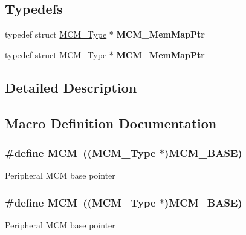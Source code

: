 \subsection*{Typedefs}
\begin{DoxyCompactItemize}
\item 
typedef struct \hyperlink{structMCM__Type}{M\+C\+M\+\_\+\+Type} $\ast$ {\bfseries M\+C\+M\+\_\+\+Mem\+Map\+Ptr}\hypertarget{group__MCM__Peripheral__Access__Layer_gad6061cc2e68f7c03970d2f22222ce817}{}\label{group__MCM__Peripheral__Access__Layer_gad6061cc2e68f7c03970d2f22222ce817}

\item 
typedef struct \hyperlink{structMCM__Type}{M\+C\+M\+\_\+\+Type} $\ast$ {\bfseries M\+C\+M\+\_\+\+Mem\+Map\+Ptr}\hypertarget{group__MCM__Peripheral__Access__Layer_gad6061cc2e68f7c03970d2f22222ce817}{}\label{group__MCM__Peripheral__Access__Layer_gad6061cc2e68f7c03970d2f22222ce817}

\end{DoxyCompactItemize}


\subsection{Detailed Description}


\subsection{Macro Definition Documentation}
\subsubsection[{\texorpdfstring{M\+CM}{MCM}}]{\setlength{\rightskip}{0pt plus 5cm}\#define M\+CM~(({\bf M\+C\+M\+\_\+\+Type} $\ast$){\bf M\+C\+M\+\_\+\+B\+A\+SE})}\hypertarget{group__MCM__Peripheral__Access__Layer_ga4cd2dcee5e786e36844ed653cfa40096}{}\label{group__MCM__Peripheral__Access__Layer_ga4cd2dcee5e786e36844ed653cfa40096}
Peripheral M\+CM base pointer 
\subsubsection[{\texorpdfstring{M\+CM}{MCM}}]{\setlength{\rightskip}{0pt plus 5cm}\#define M\+CM~(({\bf M\+C\+M\+\_\+\+Type} $\ast$){\bf M\+C\+M\+\_\+\+B\+A\+SE})}\hypertarget{group__MCM__Peripheral__Access__Layer_ga4cd2dcee5e786e36844ed653cfa40096}{}\label{group__MCM__Peripheral__Access__Layer_ga4cd2dcee5e786e36844ed653cfa40096}
Peripheral M\+CM base pointer 
